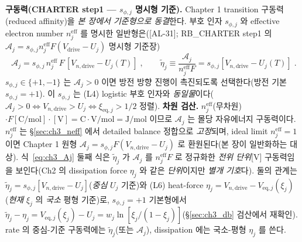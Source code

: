 \documentclass[11pt,a4paper]{article}
\newcommand{\eff}{\mathrm{eff}}
\newcommand{\eq}{\mathrm{eq}}
\newcommand{\drive}{\mathrm{drive}}
\newcommand{\AL}[1]{\textsf{[AL-#1]}}
\begin{document}
\textbf{구동력(CHARTER step1 — $s_{\phi,j}$ 명시형 기준).} Chapter 1 transition 구동력(reduced affinity)을
\emph{본 장에서 기준형으로 동결}한다. 부호 인자 $s_{\phi,j}$ 와 effective electron number $n_j^{\eff}$ 를 명시한
일반형은(\AL{31}; RB\_CHARTER step1 의 $\mathcal A_j=s_{\phi,j}n_j^\eff F(V_\drive-U_j)$ 명시형 기준장)
\begin{equation}
\boxed{\;\mathcal A_j=s_{\phi,j}\,n_j^{\eff}\,F\,[V_{n,\drive}-U_j(T)]\;,\qquad \tilde\eta_j\equiv\frac{\mathcal A_j}{n_j^{\eff}F}=s_{\phi,j}[V_{n,\drive}-U_j(T)]\;.}
\label{eq:ch3_Aj}
\end{equation}
$s_{\phi,j}\in\{+1,-1\}$ 는 $\mathcal A_j>0$ 이면 방전 방향 진행이 촉진되도록 선택한다(방전 기본 $s_{\phi,j}=+1$). 이
$s_{\phi,j}$ 는 (L4) logistic 부호 인자와 \emph{동일물}이다($\mathcal A_j>0\Leftrightarrow V_{n,\drive}>U_j\Leftrightarrow\xi_{\eq,j}>1/2$ 정렬).
\textbf{차원 검산.} $n_j^{\eff}$(무차원)$\cdot F[\mathrm{C/mol}]\cdot[\mathrm V]=\mathrm{C\cdot V/mol}=\mathrm{J/mol}$
이므로 $\mathcal A_j$ 는 몰당 자유에너지 구동력이다. $n_j^{\eff}$ 는 \S\ref{sec:ch3_neff} 에서 detailed balance
정합으로 \emph{고정}되며, ideal limit $n_j^{\eff}=1$ 이면 Chapter 1 원형 $\mathcal A_j=s_{\phi,j}F(V_{n,\drive}-U_j)$
로 환원된다(본 장이 일반화하는 대상). 식~\eqref{eq:ch3_Aj} 둘째 식은 $\tilde\eta_j$ 가 $\mathcal A_j$ 를 $n_j^\eff F$
로 정규화한 \emph{전위 단위}[V] 구동력임을 보인다(Ch2 의 dissipation force $\eta_j$ 와 같은 \emph{단위}이지만 \emph{별개
기호}다). 둘의 관계는 $\tilde\eta_j=s_{\phi,j}[V_{n,\drive}-U_j]$(\emph{중심} $U_j$ 기준)와 (L6) heat-force
$\eta_j=V_{n,\drive}-V_{\eq,j}(\xi_j)$(\emph{현재} $\xi_j$ 의 \emph{국소} 평형 기준)로, $s_{\phi,j}=+1$ 기본형에서
$\tilde\eta_j-\eta_j=V_{\eq,j}(\xi_j)-U_j=w_j\ln[\xi_j/(1-\xi_j)]$(\S\ref{sec:ch3_db} 검산에서 재확인). rate 의
중심-기준 구동력에는 $\tilde\eta_j$(또는 $\mathcal A_j$), dissipation 에는 국소-평형 $\eta_j$ 를 쓴다.
\end{document}
